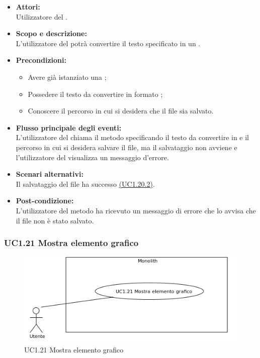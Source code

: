 \begin{itemize}
	\item \textbf{Attori:}
	\\Utilizzatore del .
	\item \textbf{Scopo e descrizione:} 
	\\L'utilizzatore del  potrà convertire il testo specificato in un .
	\item \textbf{Precondizioni:}
	\begin{itemize}
		\item Avere già istanziato una ;
		\item Possedere il testo da convertire in formato ;
		\item Conoscere il percorso in cui si desidera che il file sia salvato.
	\end{itemize}
	\item \textbf{Flusso principale degli eventi:}
	\\L'utilizzatore del  chiama il metodo specificando il testo da convertire in  e il percorso in cui si desidera salvare il file, ma il salvataggio non avviene e l'utilizzatore del  visualizza un messaggio d'errore.
	\item \textbf{Scenari alternativi:}
	\\Il salvataggio del file  ha successo \hyperref[UC1.20.2]{(UC1.20.2)}.
	\item \textbf{Post-condizione:}
	\\L'utilizzatore del metodo ha ricevuto un messaggio di errore che lo avvisa che il file  non è stato salvato.
\end{itemize}

\subsubsection{UC1.21 Mostra elemento grafico} \label{UC1.21}

\begin{figure}[H]
	\centering
	\includegraphics[width=15cm]{../../documenti/AnalisiDeiRequisiti/Diagrammi_img/uc1_21.png}
	\caption{UC1.21 Mostra elemento grafico}
\end{figure}

